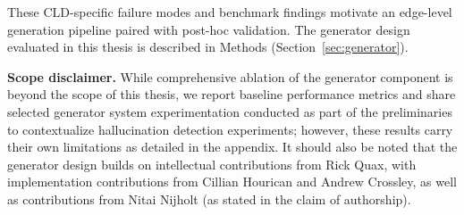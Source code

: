 \noindent These CLD-specific failure modes and benchmark findings motivate an edge-level generation pipeline paired with post-hoc validation. The generator design evaluated in this thesis is described in Methods (Section~\ref{sec:generator}).

\noindent\textbf{Scope disclaimer.} While comprehensive ablation of the generator component is beyond the scope of this thesis, we report baseline performance metrics and share selected generator system experimentation conducted as part of the preliminaries to contextualize hallucination detection experiments; however, these results carry their own limitations as detailed in the appendix. It should also be noted that the generator design builds on intellectual contributions from Rick Quax, with implementation contributions from Cillian Hourican and Andrew Crossley, as well as contributions from Nitai Nijholt (as stated in the claim of authorship).
